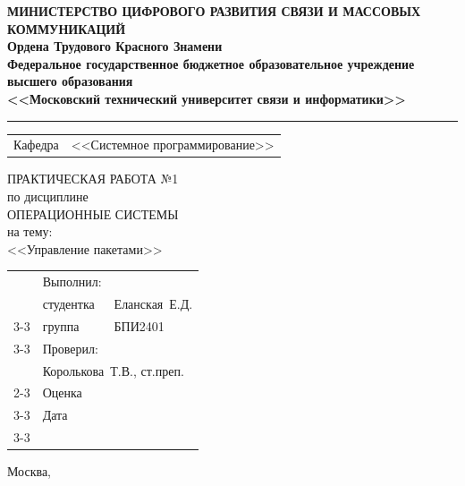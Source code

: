 \thispagestyle{empty}

\begin{center}
	\textbf{МИНИСТЕРСТВО ЦИФРОВОГО РАЗВИТИЯ СВЯЗИ И МАССОВЫХ КОММУНИКАЦИЙ} \\
	\textbf{Ордена Трудового Красного Знамени \\
		Федеральное государственное бюджетное образовательное учреждение высшего образования \\
		<<Московский технический университет связи и информатики>>}
\end{center}
\rule{\linewidth}{1pt}

\vspace{0.3em}

\begin{center}
	\begin{tabularx}{0.6\textwidth}{p{1.2cm}X}
		Кафедра & \quad <<Системное программирование>> \\%
	\end{tabularx}
\end{center}

\vspace{10em}

\begin{center}
	\Large
	ПРАКТИЧЕСКАЯ РАБОТА №1 \\
	\large
	по дисциплине \\
	ОПЕРАЦИОННЫЕ СИСТЕМЫ \\
	на тему: \\
	<<Управление пакетами>>
\end{center}

\vspace{4em}

\renewcommand{\arraystretch}{1.1}
\begin{tabularx}{\textwidth}{p{10cm}p{2cm}p{3cm}}
	& Выполнил: & \\
	& студентка & Еланская~Е.Д. \\\cline{3-3} 
	& группа & БПИ2401 \\\cline{3-3} 
	& Проверил: &  \\
	& \multicolumn{2}{l}{Королькова~Т.В., ст.преп.} \\\cline{2-3}
	& Оценка & \\\cline{3-3} 
	& Дата & \\\cline{3-3} 
\end{tabularx}

\vspace{5em}

\begin{center}
	Москва,~\the\year
\end{center}
\clearpage


